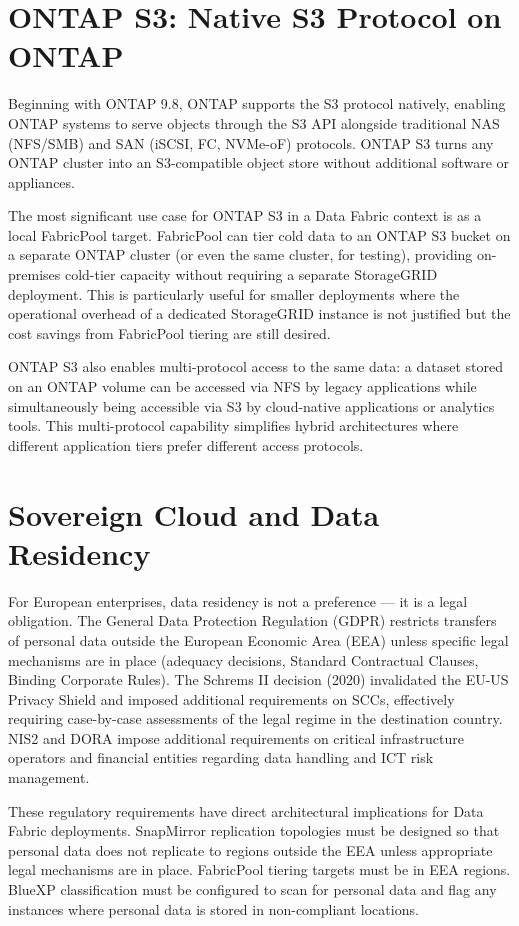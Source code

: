 \section{ONTAP S3: Native S3 Protocol on ONTAP}

Beginning with ONTAP 9.8, ONTAP supports the S3 protocol natively, enabling ONTAP systems to serve objects through the S3 API alongside traditional NAS (NFS/SMB) and SAN (iSCSI, FC, NVMe-oF) protocols. ONTAP S3 turns any ONTAP cluster into an S3-compatible object store without additional software or appliances.

The most significant use case for ONTAP S3 in a Data Fabric context is as a local FabricPool target. FabricPool can tier cold data to an ONTAP S3 bucket on a separate ONTAP cluster (or even the same cluster, for testing), providing on-premises cold-tier capacity without requiring a separate StorageGRID deployment. This is particularly useful for smaller deployments where the operational overhead of a dedicated StorageGRID instance is not justified but the cost savings from FabricPool tiering are still desired.

ONTAP S3 also enables multi-protocol access to the same data: a dataset stored on an ONTAP volume can be accessed via NFS by legacy applications while simultaneously being accessible via S3 by cloud-native applications or analytics tools. This multi-protocol capability simplifies hybrid architectures where different application tiers prefer different access protocols.

\section{Sovereign Cloud and Data Residency}

For European enterprises, data residency is not a preference --- it is a legal obligation. The General Data Protection Regulation (GDPR) restricts transfers of personal data outside the European Economic Area (EEA) unless specific legal mechanisms are in place (adequacy decisions, Standard Contractual Clauses, Binding Corporate Rules). The Schrems II decision (2020) invalidated the EU-US Privacy Shield and imposed additional requirements on SCCs, effectively requiring case-by-case assessments of the legal regime in the destination country. NIS2 and DORA impose additional requirements on critical infrastructure operators and financial entities regarding data handling and ICT risk management.

These regulatory requirements have direct architectural implications for Data Fabric deployments. SnapMirror replication topologies must be designed so that personal data does not replicate to regions outside the EEA unless appropriate legal mechanisms are in place. FabricPool tiering targets must be in EEA regions. BlueXP classification must be configured to scan for personal data and flag any instances where personal data is stored in non-compliant locations.

